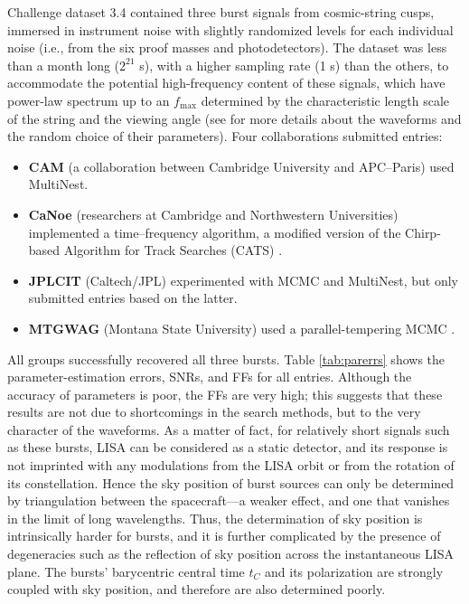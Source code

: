 \documentclass{iopart}
\begin{document}
Challenge dataset 3.4 contained three burst signals from cosmic-string cusps, immersed in instrument noise with slightly randomized levels for each individual noise (i.e., from the six proof masses and photodetectors). The dataset was less than a month long ($2^{21}$ s), with a higher sampling rate (1 s) than the others, to accommodate the potential high-frequency content of these signals, which have power-law spectrum up to an $f_\mathrm{max}$ determined by the characteristic length scale of the string and the viewing angle (see \cite{MLDC3} for more details about the waveforms and the random choice of their parameters). Four collaborations submitted entries:
%
\begin{itemize}
\item \textbf{CAM} (a collaboration between Cambridge University and APC--Paris) used MultiNest.
\item \textbf{CaNoe} (researchers at Cambridge and Northwestern Universities) implemented a time--frequency algorithm, a modified version of the Chirp-based Algorithm for Track Searches (CATS) \cite{CATS}.
\item \textbf{JPLCIT} (Caltech/JPL) experimented with MCMC and MultiNest, but only submitted entries based on the latter.
\item \textbf{MTGWAG} (Montana State University) used a parallel-tempering MCMC \cite{keycornish}. 
\end{itemize}
%
All groups successfully recovered all three bursts. Table \ref{tab:parerrs} shows the parameter-estimation errors, SNRs, and FFs for all entries. 
Although the accuracy of parameters is poor, the FFs are very high; this suggests that these results are not due to shortcomings in the search methods, but to the very character of the waveforms. As a matter of fact, for relatively short signals such as these bursts, LISA can be considered as a static detector, and its response is not imprinted with any modulations from the LISA orbit or from the rotation of its constellation. Hence the sky position of burst sources can only be determined by triangulation between the spacecraft---a weaker effect, and one that vanishes in the limit of long wavelengths. Thus, the determination of sky position is intrinsically harder for bursts, and it is further complicated by the presence of degeneracies \cite{keycornish} such as the reflection of sky position across the instantaneous LISA plane. The bursts' barycentric central time $t_C$ and its polarization are strongly coupled with sky position, and therefore are also determined poorly.
\end{document}
